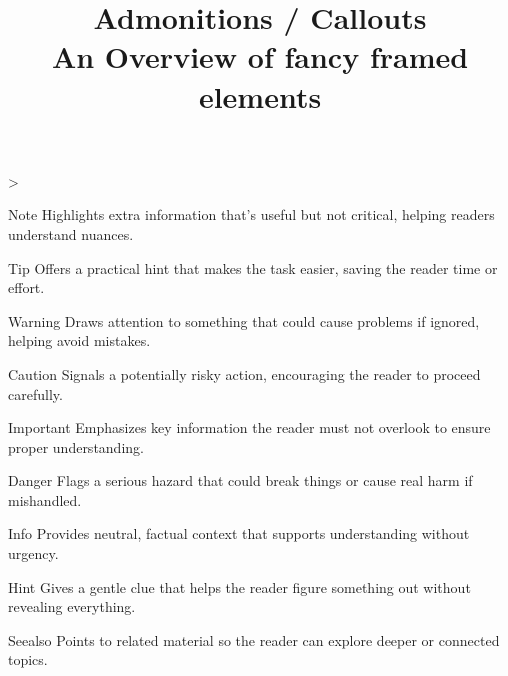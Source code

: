 \documentclass[twoside]{article}
\title{Admonitions / Callouts\\[0.5em]\large An Overview of \textbf{fancy} framed elements}
\author{}\date{}
\makeatletter
\newcommand\tsreplayfn{%
  \ts@loopcnt\z@
  \loop
    \advance\ts@loopcnt\@ne
    \ifnum\ts@loopcnt>\ts@affilcnt\else
      \xdef\@thefnmark{\csname ts@affilM\the\ts@loopcnt\endcsname}%
      \@footnotetext{\csname ts@affilT\the\ts@loopcnt\endcsname}%
  \repeat
}
\makeatother
\begin{document}
\twocolumn[{%
\maketitle
}]
\tsreplayfn

\thispagestyle{plain}
\begin{callout}{Note}
Highlights extra information that's useful but not critical, helping readers understand nuances.
\end{callout}
\begin{callout}{Tip}
Offers a practical hint that makes the task easier, saving the reader time or effort.
\end{callout}
\begin{callout}{Warning}
Draws attention to something that could cause problems if ignored, helping avoid mistakes.
\end{callout}
\begin{callout}{Caution}
Signals a potentially risky action, encouraging the reader to proceed carefully.
\end{callout}
\begin{callout}{Important}
Emphasizes key information the reader must not overlook to ensure proper understanding.
\end{callout}
\begin{callout}{Danger}
Flags a serious hazard that could break things or cause real harm if mishandled.
\end{callout}
\begin{callout}{Info}
Provides neutral, factual context that supports understanding without urgency.
\end{callout}
\begin{callout}{Hint}
Gives a gentle clue that helps the reader figure something out without revealing everything.
\end{callout}
\begin{callout}{Seealso}
Points to related material so the reader can explore deeper or connected topics.
\end{callout}
\end{document}
